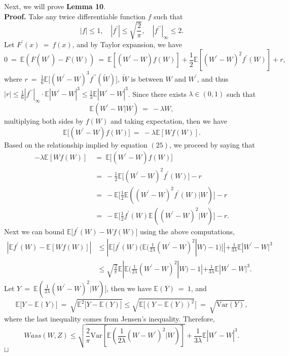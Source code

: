 \documentclass[12pt]{article}
\newcommand\qed{\hfill\hbox{\rlap{$\sqcap$}$\sqcup$}}
\newcommand{\eq }{\: = \:}
\theoremstyle{nonumberplain}
\begin{document}
Next, we will prove \textbf{Lemma 10}.\\
\textbf{Proof.} Take any twice differentiable function $f$ such that
$$
|f|\leq 1, \quad |f^{\prime}|\leq \sqrt{\frac{2}{\pi}},\quad |f^{\prime \prime}|_{\infty}\leq 2.
$$
Let $F^{\prime}(x)\eq f(x)$, and by Taylor expansion, we have
\begin{equation}
0\eq \mathbb{E}(F(W^{\prime})-F(W))\eq  \mathbb{E}[(W^{\prime}-W)f(W)]+\frac{1}{2} \mathbb{E}[(W^{\prime}-W)^{2}f^{\prime}(W)]+r,
\end{equation}
where $r\eq \frac{1}{6}\mathbb{E}\bigl[(W^{\prime}-W)^{3}f^{\prime \prime}(\widetilde{W})\bigr]$, $\widetilde{W}$ is between $W$ and $W^{\prime}$, and thus $|r|\leq \frac{1}{6} |f^{\prime \prime}|_{\infty}\cdot \mathbb{E}|W^{\prime}-W|^{3}\leq \frac{1}{3} \mathbb{E}|W^{\prime}-W|^{3}$.
Since there exists $\lambda \in (0,1)$ such that 
$$
\mathbb{E}(W^{\prime}-W|W)\eq -\lambda W,
$$
multiplying both sides by $f(W)$ and taking expectation, then we have
$$
\mathbb{E}\bigl[(W^{\prime}-W)f(W)\bigr]\eq -\lambda \mathbb{E}[Wf(W)].
$$
Based on the relationship implied by equation $(25)$, we proceed by saying that
\begin{align*}
-\lambda \mathbb{E}[Wf(W)]&\eq \mathbb{E}\bigl[(W^{\prime}-W)f(W)\bigr]\\
&\eq -\frac{1}{2} \mathbb{E}\bigl[(W^{\prime}-W)^{2}f^{\prime}(W)\bigr]-r\\
&\eq -\mathbb{E}\bigl[\frac{1}{2} \mathbb{E}((W^{\prime}-W)^{2}f^{\prime}(W)|W)\bigr]-r\\
&\eq -\mathbb{E}\bigl[\frac{1}{2} f^{\prime}(W) \mathbb{E}((W^{\prime}-W)^{2}|W)\bigr]-r.
\end{align*}
Next we can bound $\mathbb{E}\bigl[f^{\prime}(W)-Wf(W)\bigr]$ using the above computations,
\begin{align*}
|\mathbb{E}f^{\prime}(W)-\mathbb{E}[Wf(W)]|&\leq |\mathbb{E}[f^{\prime}(W)(\mathbb{E}(\frac{1}{2\lambda}(W^{\prime}-W)^{2}|W)-1)]|+\frac{1}{3\lambda} \mathbb{E}|W^{\prime}-W|^{3}\\
&\leq \sqrt{\frac{2}{\pi}} \mathbb{E}|\mathbb{E}(\frac{1}{2\lambda}(W^{\prime}-W)^{2}|W)-1| +\frac{1}{3\lambda} \mathbb{E}|W^{\prime}-W|^{3}.
\end{align*}
Let $Y\eq \mathbb{E}(\frac{1}{2\lambda}(W^{\prime}-W)^{2}|W)]$, then we have $\mathbb{E}(Y)\eq 1$, and 
$$
\mathbb{E}\bigl[Y- \mathbb{E}(Y)\bigr]\eq \sqrt{\mathbb{E}^{2}\bigl[Y- \mathbb{E}(Y)\bigr]}\leq \sqrt{\mathbb{E}\bigl[ (Y- \mathbb{E}(Y))^{2}}\bigr]\eq \sqrt{\mathrm{Var}(Y)},
$$
where the last inequality comes from Jensen's inequality.
Therefore,
$$
Wass(W,Z)\leq \sqrt{\frac{2}{\pi} \mathrm{Var}[\mathbb{E}(\frac{1}{2\lambda}(W-W^{\prime})^{2}|W)]}+\frac{1}{3\lambda} \mathbb{E}|W^{\prime}-W|^{3}.
$$
\qed
\end{document}
